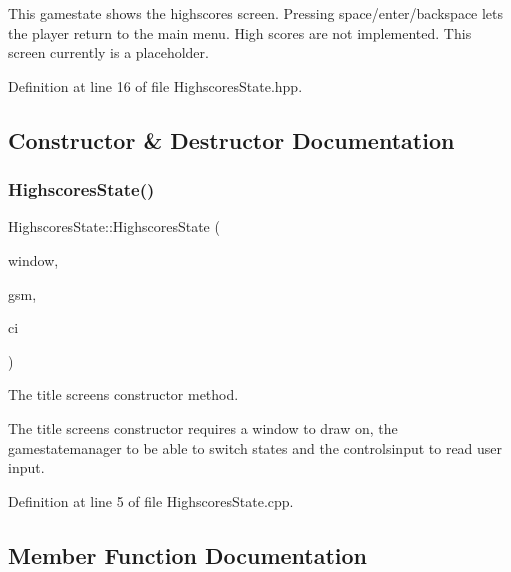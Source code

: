 This gamestate shows the highscores screen. Pressing space/enter/backspace lets the player return to the main menu. High scores are not implemented. This screen currently is a placeholder. 

Definition at line 16 of file Highscores\+State.\+hpp.



\subsection{Constructor \& Destructor Documentation}
\mbox{\label{class_highscores_state_ad01d7f96f196c29ddbdfe1827ae9b894}} 
\subsubsection{\texorpdfstring{Highscores\+State()}{HighscoresState()}}
{\footnotesize\ttfamily Highscores\+State\+::\+Highscores\+State (\begin{DoxyParamCaption}\item[{sf\+::\+Render\+Window \&}]{window,  }\item[{\hyperlink{class_game_state_manager}{Game\+State\+Manager} \&}]{gsm,  }\item[{\hyperlink{struct_controls_input}{Controls\+Input} \&}]{ci }\end{DoxyParamCaption})}



The title screen\textquotesingle{}s constructor method. 

The title screen\textquotesingle{}s constructor requires a window to draw on, the gamestatemanager to be able to switch states and the controlsinput to read user input. 

Definition at line 5 of file Highscores\+State.\+cpp.



\subsection{Member Function Documentation}
\mbox{\label{class_highscores_state_a50fc2005675f2cc1740e3f9ef698bdab}} 
